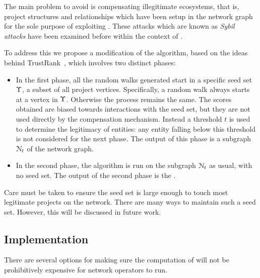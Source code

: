 The main problem to avoid is compensating illegitimate ecosystems, that is,
project structures and relationships which have been setup in the
network graph for the sole purpose of exploiting \osrank{}.
These attacks which are known as \emph{Sybil attacks} have been examined
before \cite{pagerank-sybil} within the context of \pagerank{}.

To address this we propose a modification of the \pagerank{} algorithm, based
on the ideas behind TrustRank~\cite{trustrank}, which involves two distinct
phases:

\begin{itemize}
\item In the first phase, all the random walks generated start in a specific
  seed set $\Upsilon$, a subset of all project vertices. Specifically, a random
  walk always starts at a vertex in $\Upsilon$. Otherwise the process remains
  the same. The scores obtained are biased towards interactions with the seed
  set, but they are not used directly by the compensation mechanism. Instead a
  threshold $t$ is used to determine the legitimacy of entities: any entity
  falling below this threshold is not considered for the next phase. The output
  of this phase is a subgraph $\mathcal{N}_t$ of the network graph.
\item In the second phase, the algorithm is run on the subgraph
  $\mathcal{N}_t$ as usual, with no seed set. The output of the second
  phase is the \osrank{}.
\end{itemize}
Care must be taken to ensure the seed set is large enough to touch most
legitimate projects on the network.  There are many ways to maintain such a
seed set. However, this will be discussed in future work.

\subsection{Implementation}

There are several options for making sure the computation of \osrank{}
will not be prohibitively expensive for network operators to run.

